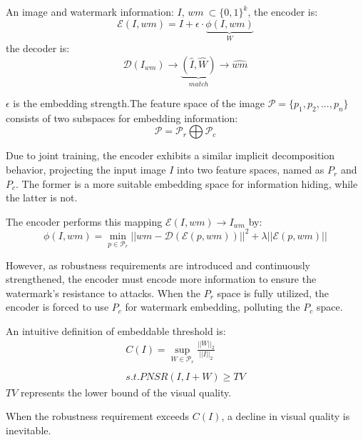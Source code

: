 \begin{definition}
An image and watermark information: $I$, $wm \ \subset \{0,1\}^k$, the encoder is:
$$\mathcal{E}(I, wm)=I+\epsilon \cdot \underbrace{\phi(I,wm)}_W$$
the decoder is:
$$\mathcal{D}(I_{wm}) \to \underbrace{(\hat{I}, \hat{W})}_{{match}} \to \hat{wm}$$



$\epsilon$ is the embedding strength.The feature space of the image $\mathcal{P} = \{p_1, p_2,...,p_n\}$ consists of two subspaces for embedding information: 
$$\mathcal{P} = \mathcal{P}_r \bigoplus \mathcal{P}_c$$

Due to joint training, the encoder exhibits a similar implicit decomposition behavior, projecting the input image $I$ into two feature spaces, named as $P_r$ and $P_c$. The former is a more suitable embedding space for information hiding, while the latter is not. 

The encoder performs this mapping $\mathcal{E}(I,wm) \to I_{wm}$ by:
$$\phi(I,wm) = \mathop{\min}_{p\in \mathcal{P}_r}||wm - \mathcal{D}(\mathcal{E}(p,wm))||^2+\lambda||\mathcal{E}(p,wm)||$$

However, as robustness requirements are introduced and continuously strengthened, the encoder must encode more information to ensure the watermark’s resistance to attacks. When the $P_r$   space is fully utilized, the encoder is forced to use $P_c$ for watermark embedding, polluting the $P_c$ space.

\end{definition}

\begin{definition}
An intuitive definition of embeddable threshold is:
\begin{gather*}
C(I) = \sup_{W \in \mathcal{P}_r}{\frac{||W||_2}{||I||_2}} \\\\
s.t. PNSR(I, I+W) \ge TV
\end{gather*}
$TV$ represents the lower bound of the visual quality.
\end{definition}

\begin{proposition}
When the robustness requirement exceeds $C(I)$, a decline in visual quality is inevitable.
\end{proposition}

